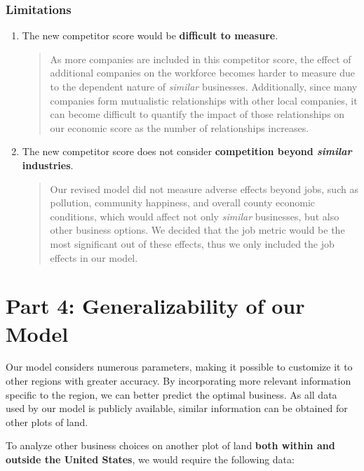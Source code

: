 \documentclass{mcmthesis}
\begin{document}
\subsubsection{Limitations}
\begin{enumerate}
    \item The new competitor score would be \textbf{difficult to measure}.
    \begin{quote}
         As more companies are included in this competitor score, the effect of additional companies on the workforce becomes harder to measure due to the dependent nature of \textit{similar} businesses. Additionally, since many companies form mutualistic relationships with other local companies, it can become difficult to quantify the impact of those relationships on our economic score as the number of relationships increases.
    \end{quote}

    \item The new competitor score does not consider \textbf{competition beyond \textit{similar} industries}.
    \begin{quote}
        Our revised model did not measure adverse effects beyond jobs, such as pollution, community happiness, and overall county economic conditions, which would affect not only \textit{similar} businesses, but also other business options. We decided that the job metric would be the most significant out of these effects, thus we only included the job effects in our model. 
    \end{quote}
\end{enumerate}

\section{Part 4: Generalizability of our Model}
Our model considers numerous parameters, making it possible to customize it to other regions with greater accuracy. By incorporating more relevant information specific to the region, we can better predict the optimal business. As all data used by our model is publicly available, similar information can be obtained for other plots of land.

To analyze other business choices on another plot of land \textbf{both within and outside the United States}, we would require the following data: 
\end{document}
